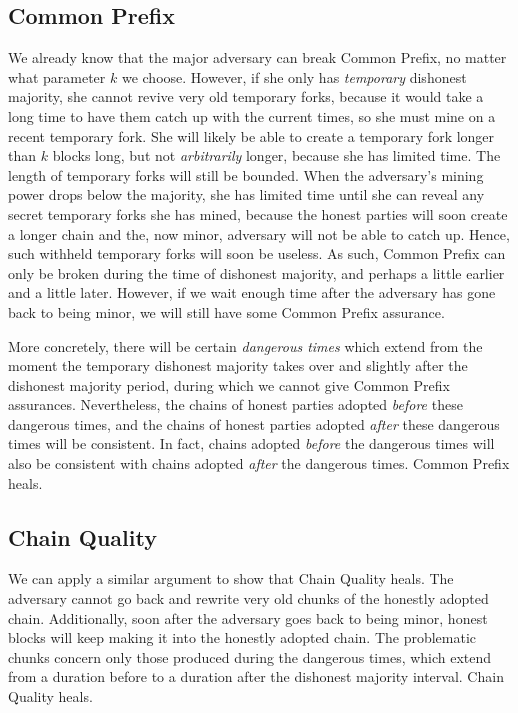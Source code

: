 \subsection*{Common Prefix}
We already know that the major adversary can break Common Prefix, no matter what parameter
$k$ we choose. However, if she only has \emph{temporary} dishonest majority, she cannot
revive very old temporary forks, because it would take a long time to have them catch up
with the current times, so she must mine on a recent temporary fork. She will likely be
able to create a temporary fork longer than $k$ blocks long, but not \emph{arbitrarily}
longer, because she has limited time. The length of temporary forks will still be bounded.
When the adversary's mining power drops below the majority, she has limited time until
she can reveal any secret temporary forks she has mined, because the honest parties will
soon create a longer chain and the, now minor, adversary will not be able to catch up.
Hence, such withheld temporary forks will soon be useless. As such, Common Prefix can only
be broken during the time of dishonest majority, and perhaps a little earlier and a little
later. However, if we wait enough time after the adversary has gone back to being minor,
we will still have some Common Prefix assurance.

More concretely, there will be certain \emph{dangerous times} which extend from the moment
the temporary dishonest majority takes over and slightly after the dishonest majority period,
during which we cannot give Common Prefix assurances. Nevertheless, the chains of honest parties
adopted \emph{before} these dangerous times, and the chains of honest parties adopted
\emph{after} these dangerous times will be consistent. In fact, chains adopted \emph{before}
the dangerous times will also be consistent with chains adopted \emph{after} the dangerous
times. Common Prefix heals.

\subsection*{Chain Quality}
We can apply a similar argument to show that Chain Quality heals. The adversary cannot
go back and rewrite very old chunks of the honestly adopted chain. Additionally, soon after
the adversary goes back to being minor, honest blocks will keep making it into the honestly
adopted chain. The problematic chunks concern only those produced during the dangerous
times, which extend from a duration before to a duration after the dishonest majority
interval. Chain Quality heals.

